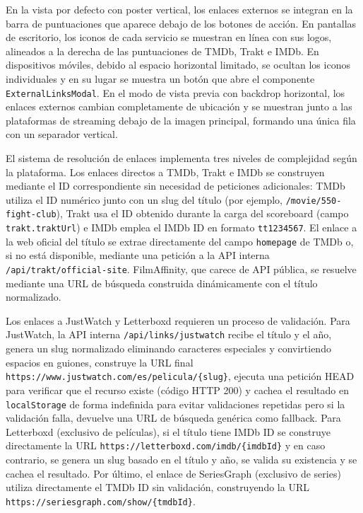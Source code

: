 En la vista por defecto con poster vertical, los enlaces externos se integran en la barra de puntuaciones que aparece debajo de los botones de acción. En pantallas de escritorio, los iconos de cada servicio se muestran en línea con sus logos, alineados a la derecha de las puntuaciones de TMDb, Trakt e IMDb. En dispositivos móviles, debido al espacio horizontal limitado, se ocultan los iconos individuales y en su lugar se muestra un botón que abre el componente \texttt{ExternalLinksModal}. En el modo de vista previa con backdrop horizontal, los enlaces externos cambian completamente de ubicación y se muestran junto a las plataformas de streaming debajo de la imagen principal, formando una única fila con un separador vertical.

El sistema de resolución de enlaces implementa tres niveles de complejidad según la plataforma. Los enlaces directos a TMDb, Trakt e IMDb se construyen mediante el ID correspondiente sin necesidad de peticiones adicionales: TMDb utiliza el ID numérico junto con un slug del título (por ejemplo, \texttt{/movie/550-fight-club}), Trakt usa el ID obtenido durante la carga del scoreboard (campo \texttt{trakt.traktUrl}) e IMDb emplea el IMDb ID en formato \texttt{tt1234567}. El enlace a la web oficial del título se extrae directamente del campo \texttt{homepage} de TMDb o, si no está disponible, mediante una petición a la API interna \texttt{/api/trakt/official-site}. FilmAffinity, que carece de API pública, se resuelve mediante una URL de búsqueda construida dinámicamente con el título normalizado.

Los enlaces a JustWatch y Letterboxd requieren un proceso de validación. Para JustWatch, la API interna \texttt{/api/links/justwatch} recibe el título y el año, genera un slug normalizado eliminando caracteres especiales y convirtiendo espacios en guiones, construye la URL final \texttt{https://www.justwatch.com/es/pelicula/\{slug\}}, ejecuta una petición HEAD para verificar que el recurso existe (código HTTP 200) y cachea el resultado en \texttt{localStorage} de forma indefinida para evitar validaciones repetidas pero si la validación falla, devuelve una URL de búsqueda genérica como fallback. Para Letterboxd (exclusivo de películas), si el título tiene IMDb ID se construye directamente la URL \texttt{https://letterboxd.com/imdb/\{imdbId\}} y en caso contrario, se genera un slug basado en el título y año, se valida su existencia y se cachea el resultado. Por último, el enlace de SeriesGraph (exclusivo de series) utiliza directamente el TMDb ID sin validación, construyendo la URL \texttt{https://seriesgraph.com/show/\{tmdbId\}}.

